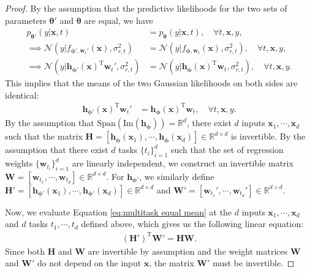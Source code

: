 \documentclass{article} %
\theoremstyle{plain}
\theoremstyle{definition}
\theoremstyle{remark}
\begin{document}
\begin{proof}
    By the assumption that the predictive likelihoods for the two sets of parameters $\boldsymbol{\theta}'$ and $\boldsymbol{\theta}$ are equal, we have
    \begin{align}
        p_{\boldsymbol{\theta}'}(y|\mathbf{x},t)&=p_{\boldsymbol{\theta}}(y|\mathbf{x},t),\quad\forall t,\mathbf{x},y,\\
        \implies\mathcal{N}(y|f_{\boldsymbol{\phi}',\mathbf{w}_t'}(\mathbf{x}),\sigma_{r,t}^2) &= \mathcal{N}(y|f_{\boldsymbol{\phi},\mathbf{w}_t}(\mathbf{x}),\sigma_{r,t}^2),\quad\forall t,\mathbf{x},y,\\
        \implies \mathcal{N}(y|\mathbf{h}_{\boldsymbol{\phi}'}(\mathbf{x})^{\text{T}}\mathbf{w}_{t}',\sigma_{r,t}^2) &= \mathcal{N}(y|\mathbf{h}_{\boldsymbol{\phi}}(\mathbf{x})^{\text{T}}\mathbf{w}_{t},\sigma_{r,t}^2),\quad\forall t,\mathbf{x},y.
    \end{align}
    This implies that the means of the two Gaussian likelihoods on both sides are identical:
    \begin{align}\label{eq:multitask equal mean}
        \mathbf{h}_{\boldsymbol{\phi}'}(\mathbf{x})^{\text{T}}\mathbf{w}_{t}' &= \mathbf{h}_{\boldsymbol{\phi}}(\mathbf{x})^{\text{T}}\mathbf{w}_t,\quad\forall t,\mathbf{x},y.
    \end{align}
    By the assumption that $\text{Span}(\text{Im}(\mathbf{h}_{\boldsymbol{\phi}}))=\mathbb{R}^d$, there exist $d$ inputs $\mathbf{x}_1,\cdots,\mathbf{x}_d$ such that the matrix $\mathbf{H}=[\mathbf{h}_{\boldsymbol{\phi}}(\mathbf{x}_1),\cdots,\mathbf{h}_{\boldsymbol{\phi}}(\mathbf{x}_d)]\in\mathbb{R}^{d\times d}$ is invertible. 
    By the assumption that there exist $d$ tasks $\{t_i\}_{i=1}^d$ such that the set of regression weights $\{\mathbf{w}_{t_i}\}_{i=1}^d$ are linearly independent, we construct an invertible matrix $\mathbf{W}=[\mathbf{w}_{t_1},\cdots,\mathbf{w}_{t_d}]\in\mathbb{R}^{d\times d}$.
    For $\mathbf{h}_{\boldsymbol{\phi}'}$, we similarly define $\mathbf{H}'=[\mathbf{h}_{\boldsymbol{\phi}'}(\mathbf{x}_1),\cdots,\mathbf{h}_{\boldsymbol{\phi}'}(\mathbf{x}_d)]\in\mathbb{R}^{d\times d}$ and $\mathbf{W}'=[\mathbf{w}_{t_1}',\cdots,\mathbf{w}_{t_d}']\in\mathbb{R}^{d\times d}$.
    
    Now, we evaluate Equation \eqref{eq:multitask equal mean} at the $d$ inputs $\mathbf{x}_1,\cdots,\mathbf{x}_d$ and $d$ tasks $t_1,\cdots,t_d$ defined above, which gives us the following linear equation:
    \begin{align}
        (\mathbf{H}')^{\text{T}}\mathbf{W}'=\mathbf{H}\mathbf{W}.
    \end{align}
    Since both $\mathbf{H}$ and $\mathbf{W}$ are invertible by assumption and the weight matrices $\mathbf{W}$ and $\mathbf{W}'$ do not depend on the input $\mathbf{x}$, the matrix $\mathbf{W}'$ must be invertible.


\end{proof}
\end{document}
